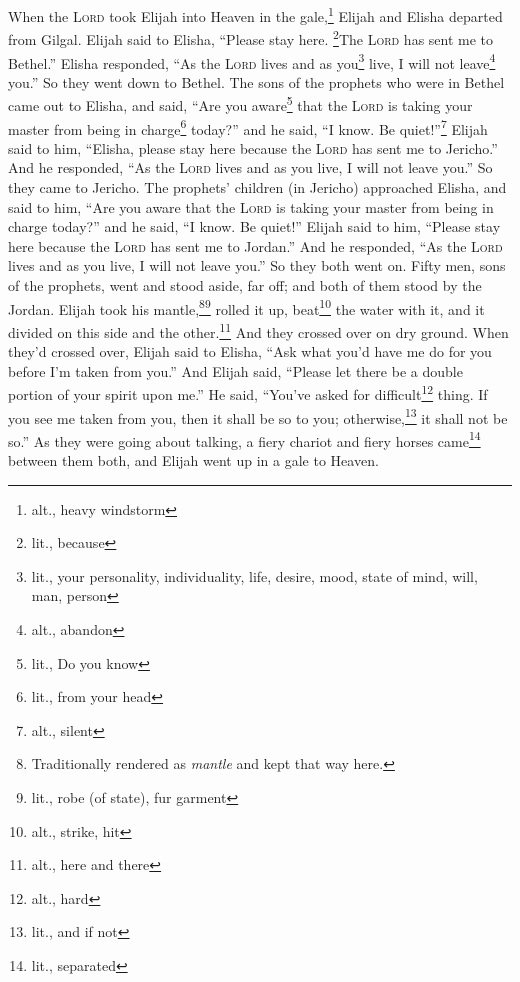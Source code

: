 
\begin{inparaenum}
     When the \textsc{Lord} took Elijah into Heaven in the gale,\footnote{alt., heavy windstorm} Elijah and Elisha departed from Gilgal.%
     Elijah said to Elisha, ``Please stay here. \footnote{lit., because}The \textsc{Lord} has sent me to Bethel.'' Elisha responded, ``As the \textsc{Lord} lives and as you\footnote{lit., your personality, individuality, life, desire, mood, state of mind, will, man, person} live, I will not leave\footnote{alt., abandon} you.'' So they went down to Bethel.%
     The sons of the prophets who were in Bethel came out to Elisha, and said, ``Are you aware\footnote{lit., Do you know} that the \textsc{Lord} is taking your master from being in charge\footnote{lit., from your head} today?'' and he said, ``I know. Be quiet!''\footnote{alt., silent}%
     Elijah said to him, ``Elisha, please stay here because the \textsc{Lord} has sent me to Jericho.'' And he responded, ``As the \textsc{Lord} lives and as you live, I will not leave you.'' So they came to Jericho.%
     The prophets' children (in Jericho) approached Elisha, and said to him, ``Are you aware that the \textsc{Lord} is taking your master from being in charge today?'' and he said, ``I know. Be quiet!''%
     Elijah said to him, ``Please stay here because the \textsc{Lord} has sent me to Jordan.'' And he responded, ``As the \textsc{Lord} lives and as you live, I will not leave you.'' So they both went on.%
     Fifty men, sons of the prophets, went and stood aside, far off; and both of them stood by the Jordan.%
     Elijah took his mantle,\footnote{Traditionally rendered as \textit{mantle} and kept that way here.}\footnote{lit., robe (of state), fur garment} rolled it up, beat\footnote{alt., strike, hit} the water with it, and it divided on this side and the other.\footnote{alt., here and there} And they crossed over on dry ground.%
     When they'd crossed over, Elijah said to Elisha, ``Ask what you'd have me do for you before I'm taken from you.'' And Elijah said, ``Please let there be a double portion of your spirit upon me.''%
     He said, ``You've asked for difficult\footnote{alt., hard} thing. If you see me taken from you, then it shall be so to you; otherwise,\footnote{lit., and if not} it shall not be so.''%
     As they were going about talking, a fiery chariot and fiery horses came\footnote{lit., separated} between them both, and Elijah went up in a gale to Heaven.%

\end{inparaenum}

